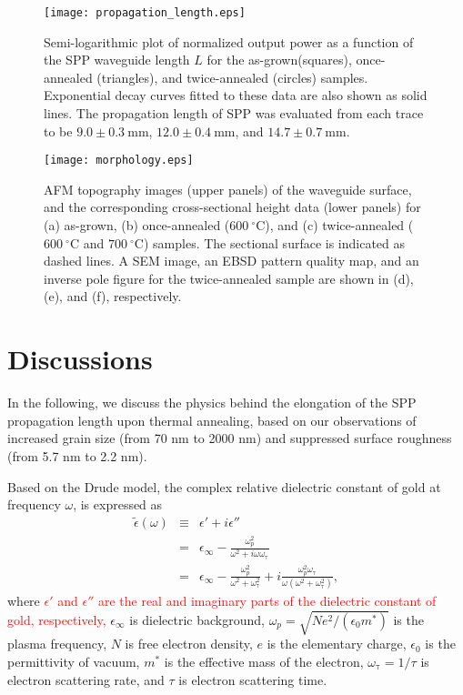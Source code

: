 \documentclass[aip,apl,reprint]{revtex4-1}
\begin{document}
 \begin{figure}
    \texttt{[image: propagation\_length.eps]}
    \caption{Semi-logarithmic plot of normalized output power as a function of the SPP waveguide length $L$ for the as-grown(squares), once-annealed (triangles), and twice-annealed (circles) samples. Exponential decay curves fitted to these data are also shown as solid lines. The propagation length of SPP was evaluated from each trace to be $9.0\pm0.3\:\mathrm{mm}$, $12.0\pm0.4\:\mathrm{mm}$, and $14.7\pm0.7\:\mathrm{mm}$.}
       \label{fig:propagation_length}
\end{figure}

  \begin{figure}
    \texttt{[image: morphology.eps]}
        \caption{AFM topography images (upper panels) of the waveguide surface, and the corresponding cross-sectional height data (lower panels) for (a) as-grown, (b) once-annealed ($600\:^\circ\mathrm{C}$), and (c) twice-annealed ($600\:^\circ\mathrm{C}$ and $700\:^\circ\mathrm{C}$) samples. The sectional surface is indicated as dashed lines. A SEM image, an EBSD pattern quality map, and an inverse pole figure for the twice-annealed sample are shown in (d), (e), and (f), respectively.}
    \label{fig:morphology}
\end{figure}

\section{Discussions}
\label{sec:discussion}
In the following, we discuss the physics behind the elongation of the SPP propagation length upon thermal annealing, based on our observations of increased grain size (from 70 nm to 2000 nm) and suppressed surface roughness (from 5.7 nm to 2.2 nm). 

\color{red}Based on the Drude model, the complex relative dielectric constant of gold at frequency $\omega$, is expressed as
\begin{eqnarray}
\tilde{\epsilon}(\omega) &\equiv& \epsilon' + i \epsilon'' \nonumber \\
&=& \epsilon_{\infty} - \frac{\omega_p^2}{\omega^2+i\omega \omega_{\mathrm{\tau}}} \nonumber \\
&=& \epsilon_{\infty} - \frac{\omega_p^2}{\omega^2+ \omega_{\mathrm{\tau}}^2} + i \frac{\omega_p^2 \omega_{\mathrm{\tau}}}{\omega (\omega^2 + \omega_{\mathrm{\tau}}^2)},
\label{eq:permittivity}
\end{eqnarray}
where \textcolor{red}{$\epsilon'$ and $\epsilon''$ are the real and imaginary parts of the dielectric constant of gold, respectively,} $\epsilon_{\infty}$ is dielectric background,  $\omega_p=\sqrt{Ne^2/ (\epsilon_0 m^*)}$ is the plasma frequency, $N$ is free electron density, $e$ is the elementary charge, $\epsilon_0$ is the permittivity of vacuum, $m^*$ is the effective mass of the electron, $\omega_{\mathrm{\tau}}=1/\tau$ is electron scattering rate, and $\tau$ is electron scattering time. 
\end{document}

